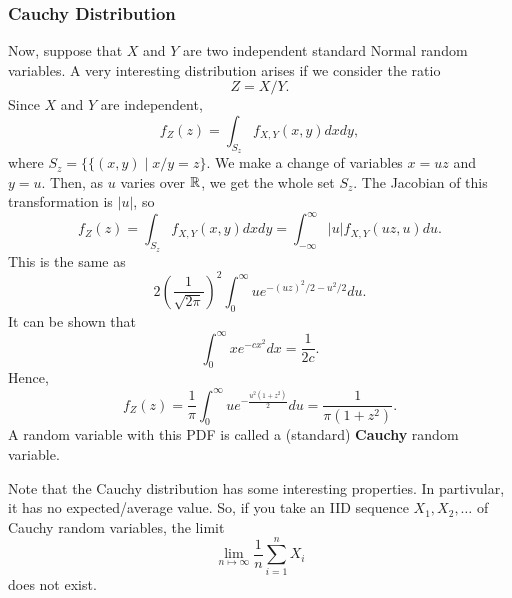 \documentclass[letterpaper]{article}
\begin{document}
\subsubsection{Cauchy Distribution}
Now, suppose that $X$ and $Y$ are two independent standard Normal random variables. A very interesting distribution arises if we consider the ratio \[Z = X / Y.\] Since $X$ and $Y$ are independent, \[f_{Z}(z) = \int_{S_z} f_{X, Y}(x, y) dx dy,\] where $S_z = \{\{(x, y) \mid x / y = z\}$. We make a change of variables $x = uz$ and $y = u$. Then, as $u$ varies over $\mathbb{R}$, we get the whole set $S_z$. The Jacobian of this transformation is $|u|$, so 
\[f_{Z}(z) = \int_{S_z} f_{X, Y}(x, y) dxdy = \int_{-\infty}^{\infty} |u| f_{X, Y}(uz, u) du.\]
This is the same as 
\[2\left(\frac{1}{\sqrt{2\pi}}\right)^2 \int_{0}^{\infty} ue^{-(uz)^2 / 2 - u^2 / 2} du.\]
It can be shown that 
\[\int_0^{\infty} xe^{-cx^2} dx = \frac{1}{2c}.\]
Hence,
\[f_{Z}(z) = \frac{1}{\pi} \int_0^{\infty} ue^{-\frac{u^2 (1 + z^2)}{2}} du = \frac{1}{\pi (1 + z^2)}.\]
A random variable with this PDF is called a (standard) \textbf{Cauchy} random variable. 

\bigskip 

Note that the Cauchy distribution has some interesting properties. In partivular, it has no expected/average value. So, if you take an IID sequence $X_1, X_2, \dots$ of Cauchy random variables, the limit 
\[\lim_{n \mapsto \infty} \frac{1}{n} \sum_{i = 1}^n X_i\]
does not exist. 
\end{document}
